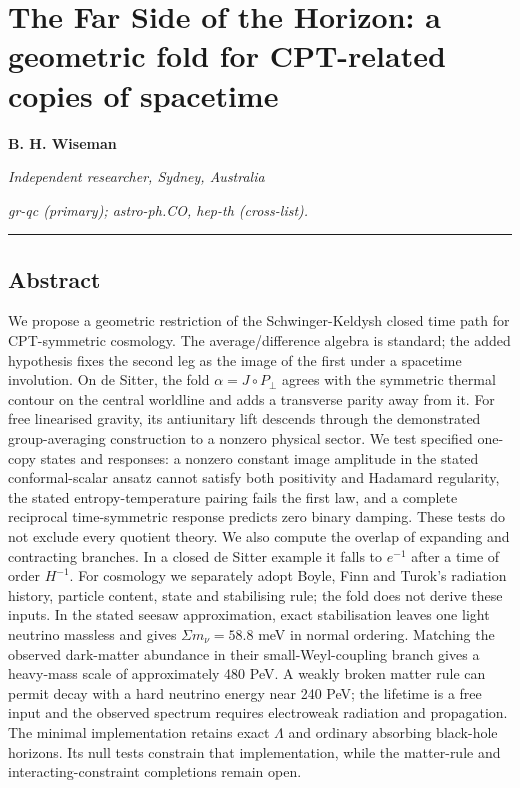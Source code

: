 \documentclass[
]{article}
\author{}
\date{}
\begin{document}
\section{The Far Side of the Horizon: a geometric fold for CPT-related
copies of
spacetime}\label{the-far-side-of-the-horizon-a-geometric-fold-for-cpt-related-copies-of-spacetime}

\textbf{B. H. Wiseman}

\emph{Independent researcher, Sydney, Australia}

\emph{gr-qc (primary); astro-ph.CO, hep-th (cross-list).}

\begin{center}\rule{0.5\linewidth}{0.5pt}\end{center}

\subsection{Abstract}\label{abstract}

We propose a geometric restriction of the Schwinger-Keldysh closed time
path for CPT-symmetric cosmology. The average/difference algebra is
standard; the added hypothesis fixes the second leg as the image of the
first under a spacetime involution. On de Sitter, the fold
\(\alpha=J\circ P_\perp\) agrees with the symmetric thermal contour on
the central worldline and adds a transverse parity away from it. For
free linearised gravity, its antiunitary lift descends through the
demonstrated group-averaging construction to a nonzero physical sector.
We test specified one-copy states and responses: a nonzero constant
image amplitude in the stated conformal-scalar ansatz cannot satisfy
both positivity and Hadamard regularity, the stated entropy-temperature
pairing fails the first law, and a complete reciprocal time-symmetric
response predicts zero binary damping. These tests do not exclude every
quotient theory. We also compute the overlap of expanding and
contracting branches. In a closed de Sitter example it falls to
\(e^{-1}\) after a time of order \(H^{-1}\). For cosmology we separately
adopt Boyle, Finn and Turok's radiation history, particle content, state
and stabilising rule; the fold does not derive these inputs. In the
stated seesaw approximation, exact stabilisation leaves one light
neutrino massless and gives \(\Sigma m_\nu=58.8\) meV in normal
ordering. Matching the observed dark-matter abundance in their
small-Weyl-coupling branch gives a heavy-mass scale of approximately 480
PeV. A weakly broken matter rule can permit decay with a hard neutrino
energy near 240 PeV; the lifetime is a free input and the observed
spectrum requires electroweak radiation and propagation. The minimal
implementation retains exact \(\Lambda\) and ordinary absorbing
black-hole horizons. Its null tests constrain that implementation, while
the matter-rule and interacting-constraint completions remain open.
\end{document}
